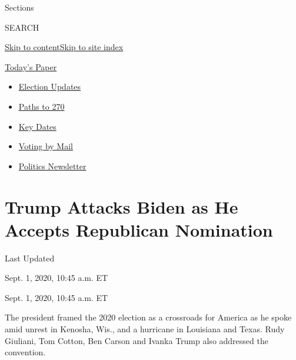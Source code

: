 Sections

SEARCH

\protect\hyperlink{site-content}{Skip to
content}\protect\hyperlink{site-index}{Skip to site index}

\href{https://myaccount.nytimes3xbfgragh.onion/auth/login?response_type=cookie\&client_id=vi}{}

\href{https://www.nytimes3xbfgragh.onion/section/todayspaper}{Today's
Paper}

\begin{itemize}
\item
  \href{https://www.nytimes3xbfgragh.onion/live/2020/09/11/us/trump-vs-biden?action=click\&pgtype=Article\&state=default\&region=TOP_BANNER\&context=storylines_menu}{Election
  Updates}
\item
  \href{https://www.nytimes3xbfgragh.onion/interactive/2020/us/elections/election-states-biden-trump.html?action=click\&pgtype=Article\&state=default\&region=TOP_BANNER\&context=storylines_menu}{Paths
  to 270}
\item
  \href{https://www.nytimes3xbfgragh.onion/interactive/2019/us/elections/2020-presidential-election-calendar.html?action=click\&pgtype=Article\&state=default\&region=TOP_BANNER\&context=storylines_menu}{Key
  Dates}
\item
  \href{https://www.nytimes3xbfgragh.onion/interactive/2020/08/31/us/politics/vote-by-mail-deadlines.html?action=click\&pgtype=Article\&state=default\&region=TOP_BANNER\&context=storylines_menu}{Voting
  by Mail}
\item
  \href{https://www.nytimes3xbfgragh.onion/newsletters/politics?action=click\&pgtype=Article\&state=default\&region=TOP_BANNER\&context=storylines_menu}{Politics
  Newsletter}
\end{itemize}

\hypertarget{trump-attacks-biden-as-he-accepts-republican-nomination}{%
\section{Trump Attacks Biden as He Accepts Republican
Nomination}\label{trump-attacks-biden-as-he-accepts-republican-nomination}}

Last Updated

Sept. 1, 2020, 10:45 a.m. ET

Sept. 1, 2020, 10:45 a.m. ET

The president framed the 2020 election as a crossroads for America as he
spoke amid unrest in Kenosha, Wis., and a hurricane in Louisiana and
Texas. Rudy Giuliani, Tom Cotton, Ben Carson and Ivanka Trump also
addressed the convention.

